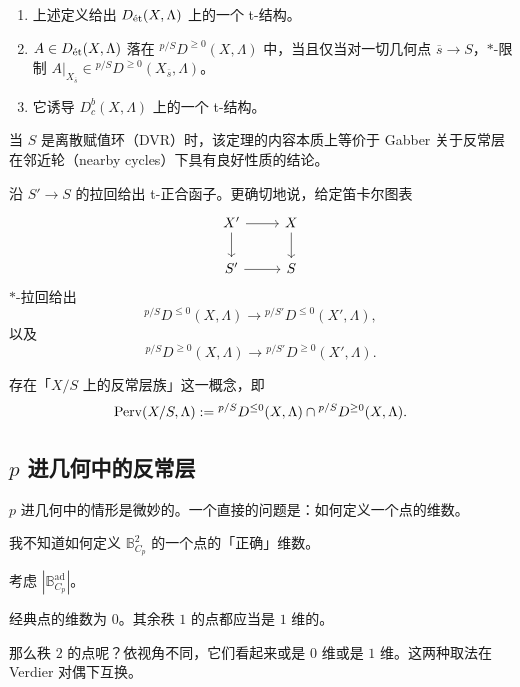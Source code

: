 \begin{theorem}[Hansen-S]
\begin{enumerate}[label=(\arabic*)]
\item 上述定义给出 $D_\et(X,\Lambda)$ 上的一个 t-结构。
\item $A\in D_\et(X,\Lambda)$ 落在 ${}^{p/S}D^{\ge0}(X,\Lambda)$ 中，当且仅当对一切几何点 $\overline{s}\to S$，$*$-限制 $A|_{X_{\overline{s}}}\in{}^{p/S}D^{\ge0}(X_{\overline{s}},\Lambda)$。
\item 它诱导 $D^b_c(X,\Lambda)$ 上的一个 t-结构。
\end{enumerate}
\end{theorem}

\begin{remark}
当 $S$ 是离散赋值环（DVR）时，该定理的内容本质上等价于 Gabber 关于反常层在邻近轮（nearby cycles）下具有良好性质的结论。
\end{remark}

\begin{corollary}
沿 $S'\to S$ 的拉回给出 t-正合函子。更确切地说，给定笛卡尔图表
\[
\begin{tikzcd}
X' \arrow[r] \arrow[d] & X \arrow[d] \\
S' \arrow[r] & S
\end{tikzcd}
\]
$*$-拉回给出
\[
{}^{p/S}D^{\le0}(X,\Lambda)\to{}^{p/S'}D^{\le0}(X',\Lambda),
\]
以及
\[
{}^{p/S}D^{\ge0}(X,\Lambda)\to{}^{p/S'}D^{\ge0}(X',\Lambda).
\]
\end{corollary}

\begin{corollary}
存在「$X/S$ 上的反常层族」这一概念，即
\[
\Perv(X/S,\Lambda):={}^{p/S}D^{\le0}(X,\Lambda)\cap{}^{p/S}D^{\ge0}(X,\Lambda).
\]
\end{corollary}

\subsection{$p$ 进几何中的反常层}

$p$ 进几何中的情形是微妙的。一个直接的问题是：如何定义一个点的维数。

\begin{warning}
我不知道如何定义 $\mathbb{B}^2_{C_p}$ 的一个点的「正确」维数。
\end{warning}

\begin{example}
考虑 $|\mathbb{B}^{\mathrm{ad}}_{C_p}|$。
\begin{center}
\end{center}

经典点的维数为 $0$。其余秩 $1$ 的点都应当是 $1$ 维的。

那么秩 $2$ 的点呢？依视角不同，它们看起来或是 $0$ 维或是 $1$ 维。这两种取法在 Verdier 对偶下互换。
\end{example}

